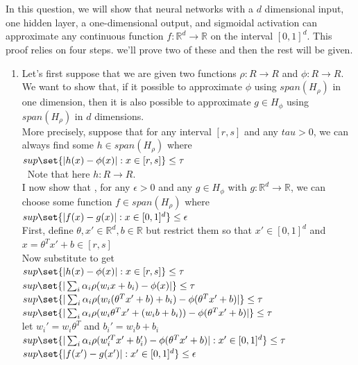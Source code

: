 \documentclass[1pt]{article}
\begin{document}
\section{   }
In this question, we will show that neural networks with a $d$ dimensional input, one hidden layer, a one-dimensional output, and sigmoidal activation can approximate any continuous function $f : \mathbb{R}^d \rightarrow \mathbb{R}$ on the interval $[0, 1]^d$.
This proof relies on four steps. we'll prove two of these and then the rest will be given.
\begin{enumerate}[label=\arabic*.]
\item Let’s first suppose that we are given two functions $\rho : R \rightarrow R $ and $ \phi : R \rightarrow R$. We want to show that, if it possible to approximate $\phi$ using $span(H_\rho)$ in one dimension, then it is also possible to approximate $g \in H_\phi$ using $span(H_\rho)$ in $d$ dimensions. \\
More precisely, suppose that for any interval $[r, s]$ and any $tau > 0$, we can always find some $h \in  span(H_\rho)$ where
$sup \set{|h(x) - \phi(x)| : x \in [r, s]} \leq \tau$\\  
Note that here $h : R \rightarrow R$.\\
I now show that , for any $\epsilon  > 0 $ and any $g \in H_\phi$ with $g : \mathbb{R}^d \rightarrow \mathbb{R}$, we can choose some function $f \in span(H_\rho)$ where\\
$sup \set{|f(x) - g(x)| : x \in [0, 1]^d} \leq \epsilon$	\\
First, define $\theta, x' \in \mathbb{R}^d, b \in \mathbb{R}$ but restrict them so that $x' \in [0, 1]^d$ and $x = \theta^Tx'+b \in [r, s]$\\
Now substitute to get \\
$sup \set{|h(x) - \phi(x)| : x \in [r, s]} \leq \tau$\\ 
$sup \set{|\sum_i \alpha_i \rho(w_i x + b_i) - \phi(x)|} \leq \tau$\\
$sup \set{|\sum_i \alpha_i \rho(w_i (\theta^T x' + b) + b_i) - \phi(\theta^T x' + b)|} \leq \tau$\\ 
$sup \set{|\sum_i \alpha_i \rho(w_i \theta^T x' + (w_i b + b_i)) - \phi(\theta^T x' + b)|} \leq \tau$\\ 
let $w_i' = w_i \theta^T$  and  $b_i' = w_i b + b_i$\\
$sup \set{|\sum_i \alpha_i \rho(w_i'^T x' + b_i') - \phi(\theta^T x' + b)|: x' \in [0, 1]^d} \leq \tau$\\ 
$sup \set{|f(x') - g(x')|: x' \in [0, 1]^d} \leq \epsilon$\\ 

\end{enumerate}
\end{document}
